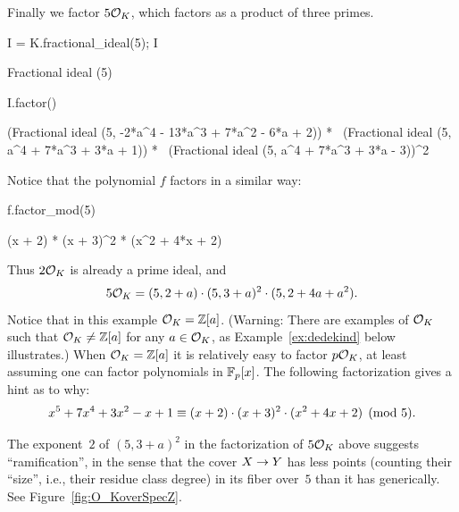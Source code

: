 \par\noindent{}Finally we factor $5\mathcal{O}_K$, which factors as a product of three
primes.
\begin{sagecode}
\begin{sagecell}
I = K.fractional_ideal(5); I
\end{sagecell}
\begin{sageout}
Fractional ideal (5)
\end{sageout}
\begin{sagecell}
I.factor()
\end{sagecell}
\begin{sageout}
(Fractional ideal (5, -2*a^4 - 13*a^3 + 7*a^2 - 6*a + 2)) * \
(Fractional ideal (5, a^4 + 7*a^3 + 3*a + 1)) * \
(Fractional ideal (5, a^4 + 7*a^3 + 3*a - 3))^2
\end{sageout}
\end{sagecode} %
Notice that the polynomial $f$ factors in a similar way:
\begin{sagecode} %
\begin{sagecell}
f.factor_mod(5)
\end{sagecell}
\begin{sageout}
(x + 2) * (x + 3)^2 * (x^2 + 4*x + 2)
\end{sageout}
\end{sagecode}
Thus $2\mathcal{O}_K$ is already a prime ideal, and
$$
  5\mathcal{O}_K = (5,2+a)\cdot(5,3+a)^2\cdot(5,2+4a+a^2).
$$
Notice that in this example $\mathcal{O}_K=\mathbb{Z}[a]$.  (Warning: There are
examples of $\mathcal{O}_K$ such that $\mathcal{O}_K\neq \mathbb{Z}[a]$ for any $a\in\mathcal{O}_K$, as
Example~\ref{ex:dedekind} below illustrates.)  When $\mathcal{O}_K=\mathbb{Z}[a]$ it is
relatively easy to factor $p\mathcal{O}_K$, at least assuming one can factor
polynomials in $\mathbb{F}_p[x]$.  The following
factorization gives a hint as to why:
$$
  x^5+7x^4+3x^2-x+1 \equiv (x+2)\cdot (x+3)^2 \cdot (x^2+4x+2)\pmod{5}.
$$

The exponent~$2$ of $(5,3+a)^2$ in the factorization of $5\mathcal{O}_K$ above
suggests ``ramification'',
in the sense that the cover $X\rightarrow Y$ has less points (counting their ``size'', i.e.,
their residue class degree) in its fiber over~$5$ than
it has generically.
See Figure~\ref{fig:O_KoverSpecZ}.

